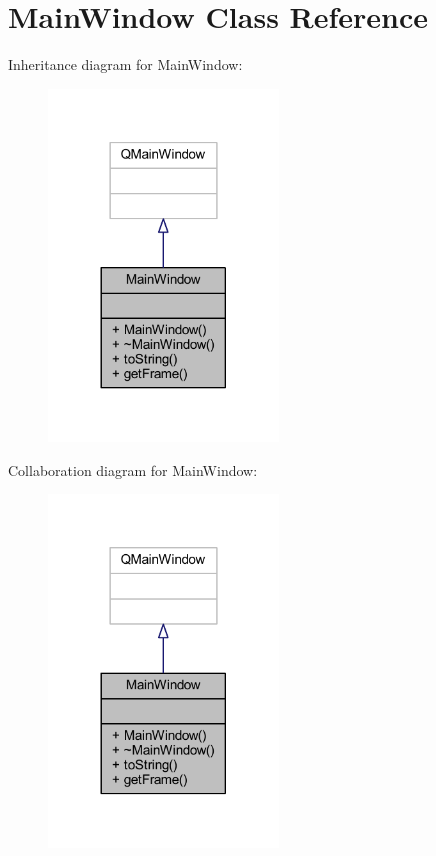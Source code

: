 \hypertarget{class_main_window}{}\section{Main\+Window Class Reference}
\label{class_main_window}


Inheritance diagram for Main\+Window\+:\nopagebreak
\begin{figure}[H]
\begin{center}
\leavevmode
\includegraphics[width=173pt]{de/d4b/class_main_window__inherit__graph}
\end{center}
\end{figure}


Collaboration diagram for Main\+Window\+:\nopagebreak
\begin{figure}[H]
\begin{center}
\leavevmode
\includegraphics[width=173pt]{d0/db8/class_main_window__coll__graph}
\end{center}
\end{figure}
